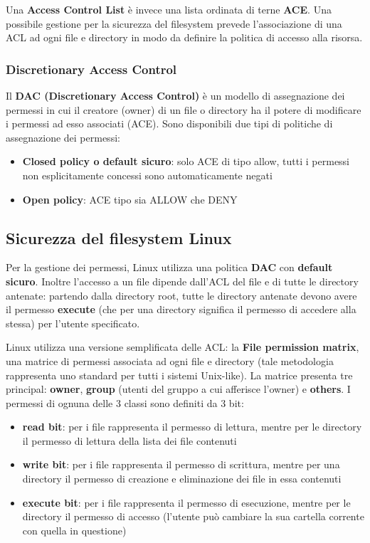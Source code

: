 Una \textbf{Access Control List} è invece una lista ordinata di terne \textbf{ACE}. Una possibile gestione per la sicurezza del filesystem prevede l'associazione di una ACL ad ogni file e directory in modo da definire la politica di accesso alla risorsa.

\subsubsection{Discretionary Access Control}
Il \textbf{DAC (Discretionary Access Control)} è un modello di assegnazione dei permessi in cui il creatore (owner) di un file o directory ha il potere di modificare i permessi ad esso associati (ACE). Sono disponibili due tipi di politiche di assegnazione dei permessi:
\begin{itemize}
  \item \textbf{Closed policy o default sicuro}: solo ACE di tipo allow, tutti i permessi non esplicitamente concessi sono automaticamente negati
  \item \textbf{Open policy}: ACE tipo sia ALLOW che DENY
\end{itemize}

\subsection{Sicurezza del filesystem Linux}
Per la gestione dei permessi, Linux utilizza una politica \textbf{DAC} con \textbf{default sicuro}. Inoltre l'accesso a un file dipende dall'ACL del file e di tutte le directory antenate: partendo dalla directory root, tutte le directory antenate devono avere il permesso \textbf{execute} (che per una directory significa il permesso di accedere alla stessa) per l'utente specificato. \newline

Linux utilizza una versione semplificata delle ACL: la \textbf{File permission matrix}, una matrice di permessi associata ad ogni file e directory (tale metodologia rappresenta uno standard per tutti i sistemi Unix-like). La matrice presenta tre principal: \textbf{owner}, \textbf{group} (utenti del gruppo a cui afferisce l'owner) e \textbf{others}. I permessi di ognuna delle 3 classi sono definiti da 3 bit:
\begin{itemize}
  \item \textbf{read bit}: per i file rappresenta il permesso di lettura, mentre per le directory il permesso di lettura della lista dei file contenuti
  \item \textbf{write bit}: per i file rappresenta il permesso di scrittura, mentre per una directory il permesso di creazione e eliminazione dei file in essa contenuti
  \item \textbf{execute bit}: per i file rappresenta il permesso di esecuzione, mentre per le directory il permesso di accesso (l'utente può cambiare la sua cartella corrente con quella in questione)
\end{itemize}

